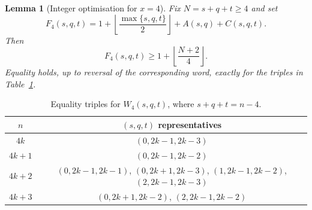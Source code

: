 \documentclass[11pt]{article}
\newtheorem{lemma}[theorem]{Lemma}
\theoremstyle{definition}
\begin{document}
\begin{lemma}[Integer optimisation for $x=4$]\label{lem:x4-optimisation}
Fix $N=s+q+t\ge4$ and set
\[
 F_4(s,q,t)=1+\left\lfloor\frac{\max\{s,q,t\}}2\right\rfloor+A(s,q)+C(s,q,t).
\]
Then
\[
 F_4(s,q,t)\ge1+\left\lfloor\frac{N+2}{4}\right\rfloor.
\]
Equality holds, up to reversal of the corresponding word, exactly for the triples in Table~\ref{tab:x4-triples}.
\end{lemma}

\begin{table}[ht]
\centering
\begin{tabular}{c|c}
\toprule
$n$ & $(s,q,t)$ representatives \\
\midrule
$4k$ & $(0,2k-1,2k-3)$ \\
$4k+1$ & $(0,2k-1,2k-2)$ \\
$4k+2$ & $(0,2k-1,2k-1)$, $(0,2k+1,2k-3)$, $(1,2k-1,2k-2)$, $(2,2k-1,2k-3)$ \\
$4k+3$ & $(0,2k+1,2k-2)$, $(2,2k-1,2k-2)$ \\
\bottomrule
\end{tabular}
\caption{Equality triples for $W_4(s,q,t)$, where $s+q+t=n-4$.}
\label{tab:x4-triples}
\end{table}
\end{document}
